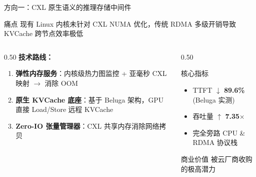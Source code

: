 \documentclass[aspectratio=169, 10pt, UTF8]{ctexbeamer}
\begin{document}
\begin{frame}{方向一：CXL 原生语义的推理存储中间件}
  \begin{block}{痛点}
    现有 Linux 内核未针对 CXL NUMA 优化，传统 RDMA 多级开销导致 KVCache 跨节点效率极低
  \end{block}

  \begin{columns}[T]
    \begin{column}{0.50\textwidth}
      \textbf{技术路线：}
      \begin{enumerate}
        \item \textbf{弹性内存服务}：内核级热力图监控 + 亚毫秒 CXL 映射 $\to$ 消除 OOM
        \item \textbf{原生 KVCache 底座}：基于 Beluga 架构，GPU 直接 Load/Store 远程 KVCache
        \item \textbf{Zero-IO 张量管理器}：CXL 共享内存消除网络拷贝
      \end{enumerate}
    \end{column}
    \begin{column}{0.50\textwidth}
      \begin{exampleblock}{核心指标}
        \begin{itemize}
          \item TTFT $\downarrow$ \textbf{89.6\%} (Beluga 实测)
          \item 吞吐量 $\uparrow$ \textbf{7.35$\times$}
          \item 完全旁路 CPU \& RDMA 协议栈
        \end{itemize}
      \end{exampleblock}

      \begin{alertblock}{商业价值}
        被云厂商收购的极高潜力
      \end{alertblock}
    \end{column}
  \end{columns}
\end{frame}
\end{document}
